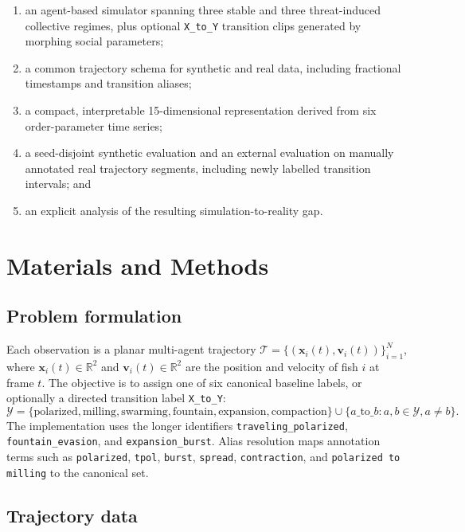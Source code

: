 \documentclass[11pt]{article}
\begin{document}
\begin{enumerate}[leftmargin=*]
  \item an agent-based simulator spanning three stable and three threat-induced collective regimes,
  plus optional \texttt{X\_to\_Y} transition clips generated by morphing social parameters;
  \item a common trajectory schema for synthetic and real data, including fractional timestamps and
  transition aliases;
  \item a compact, interpretable 15-dimensional representation derived from six order-parameter time
  series;
  \item a seed-disjoint synthetic evaluation and an external evaluation on manually annotated real
  trajectory segments, including newly labelled transition intervals; and
  \item an explicit analysis of the resulting simulation-to-reality gap.
\end{enumerate}

\section{Materials and Methods}

\subsection{Problem formulation}

Each observation is a planar multi-agent trajectory
\(\mathcal{T}=\{(\bm{x}_i(t),\bm{v}_i(t))\}_{i=1}^{N}\), where
\(\bm{x}_i(t)\in\mathbb{R}^{2}\) and \(\bm{v}_i(t)\in\mathbb{R}^{2}\) are the
position and velocity of fish \(i\) at frame \(t\). The objective is to assign one of six canonical
baseline labels, or optionally a directed transition label \texttt{X\_to\_Y}:
\[
\mathcal{Y}=\{\text{polarized},\text{milling},\text{swarming},
\text{fountain},\text{expansion},\text{compaction}\}
\cup\{a\_\mathrm{to}\_b : a,b\in\mathcal{Y}, a\neq b\}.
\]
The implementation uses the longer identifiers \texttt{traveling\_polarized},
\texttt{fountain\_evasion}, and \texttt{expansion\_burst}. Alias resolution maps annotation terms such
as \texttt{polarized}, \texttt{tpol}, \texttt{burst}, \texttt{spread}, \texttt{contraction}, and
\texttt{polarized to milling} to the canonical set.

\subsection{Trajectory data}
\end{document}
